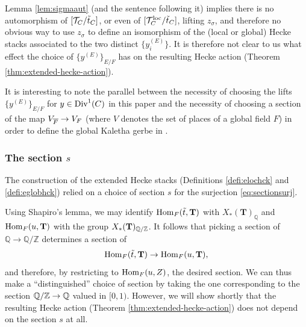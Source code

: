 Lemma \ref{lem:sigmaaut} (and the sentence following it) implies there is no automorphism of $[\mathcal{T}_{C}/\tilde{t}_{C}]$, or even of $[\mathcal{T}_{C}^{\mathrm{loc}}/\tilde{t}_{C}]$, lifting $z_{\sigma}$, and therefore no obvious way to use $z_{\sigma}$ to define an isomorphism of the (local or global) Hecke stacks associated to the two distinct $\{y_{i}^{(E)}\}$. It is therefore not clear to us what effect the choice of $\{y^{(E)}\}_{E/F}$ has on the resulting Hecke action (Theorem \ref{thm:extended-hecke-action}).

\begin{rque}
It is interesting to note the parallel between the necessity of choosing the lifts $\{y^{(E)}\}_{E/F}$ for $y \in \mathrm{Div}^{1}(C)$ in this paper and the necessity of choosing a section of the map $V_{\overline{F}} \to V_{F}$ (where $V$ denotes the set of places of a global field $F$) in order to define the global Kaletha gerbe in \cite{Kaletha18b}.
\end{rque}

\subsubsection{The section $s$}
The construction of the extended Hecke stacks (Definitions \ref{defi:elochck} and \ref{defi:eglobhck}) relied on a choice of section $s$ for the surjection \eqref{eq:sectionsurj}.
 
 Using Shapiro's lemma, we may identify $\mathrm{Hom}_{F}(\tilde{t},\mathbf{T})$ with $X_{*}(\mathbf{T})_{\mathbb{Q}}$ and $\mathrm{Hom}_{F}(u,\mathbf{T})$ with the group $X_{*}(\mathbf{T})_{\mathbb{Q}/\mathbb{Z}}$. It follows that picking a section of $\mathbb{Q} \to \mathbb{Q}/\mathbb{Z}$ determines a section of 
 \begin{equation*}
\mathrm{Hom}_{F}(\tilde{t},\mathbf{T}) \to \mathrm{Hom}_{F}(u,\mathbf{T}),
 \end{equation*}
 and therefore, by restricting to $\mathrm{Hom}_{F}(u,Z)$, the desired section. We can thus make a ``distinguished'' choice of section by taking the one corresponding to the section $\mathbb{Q}/\mathbb{Z} \to \mathbb{Q}$ valued in $[0,1)$. However, we will show shortly that the resulting Hecke action (Theorem \ref{thm:extended-hecke-action}) does not depend on the section $s$ at all. 
 
